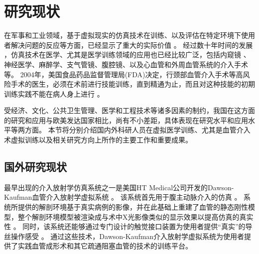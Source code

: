 \section{研究现状}
\label{sec1-4}


在军事和工业领域，基于虚拟现实的仿真技术在训练、以及评估在特定环境下使用者解决问题的反应等方面，已经显示了重大的实际价值 \cite{Goodwin1978Simulator,Rolfe1986Simulators,Ressler1999Simulators,Wachtel1985Simulators,Liu2013Military}。%
经过数十年时间的发展 \cite{Dawson1998}，仿真技术在医学、尤其是医学训练领域的应用也已经比较广泛，包括内窥镜 \cite{Vining1995Endoscopy,Preminger1996Endoscopy}、神经医学\cite{Kockro2000Neurosurgery,Cotin2005EVE,Ma2007NeuroCath}、麻醉学\cite{Gaba1988Anesthesiology}、支气管镜\cite{Vining1996Bronchoscopy}、腹腔镜\cite{Hon1994Laparoscopy,Derossis1998Laparoscopy}、以及心血管和外周血管系统的介入手术\cite{Chui1998ICard,Cotin2000ICTS,Tan2012NUDT}等。%
2004年，美国食品药品监督管理局(FDA)决定，行颈部血管介入手术等高风险手术的医生，必须在术前进行技能训练，直到精通为止，而且对这种技能的初期训练实践不能在病人身上进行 \cite{Dawson2006Medicine}。%

受经济、文化、公共卫生管理、医学和工程技术等诸多因素的制约，我国在这方面的研究和应用与欧美发达国家相比，尚有不小差距，具体表现在研究水平和应用水平等两方面。
本节将分别介绍国内外科研人员在虚拟医学训练、尤其是血管介入术虚拟训练以及相关研究方向上所作的主要工作和重要成果。

\subsection{国外研究现状}
\label{sec1-4-1}

最早出现的介入放射学仿真系统之一是美国HT Medical公司开发的Dawson-Kaufman血管介入放射学虚拟系统 \cite{Higgins1995DK,Dawson1996DK,meglan1996DK}。
该系统首先用于腹主动脉介入的仿真 \cite{Wang1998ICard}。
系统所提供的解剖环境基于真实病例的影像，并在此基础上重建了血管的静态刚性模型，整个解剖环境模型被渲染成与术中X光影像类似的显示效果以提高仿真的真实性 \cite{Higgins1995DK}。
同时，该系统还能够通过专门设计的触觉接口装置为使用者提供“真实”的导丝操作感受 \cite{BroNielsen1997DK}。
通过这些技术，Dawson-Kaufman介入放射学虚拟系统为使用者提供了实践血管成形术和其它疏通阻塞血管的技术的训练平台。

